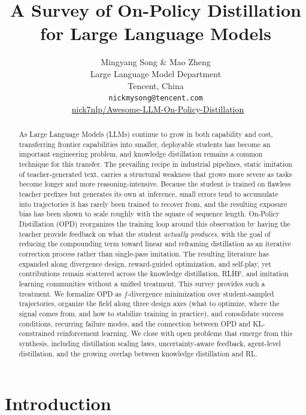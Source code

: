 \documentclass{article} %
\title{A Survey of On-Policy Distillation for Large Language Models}
\author{Mingyang Song \& Mao Zheng \\
Large Language Model Department \\Tencent, China\\
\texttt{nickmysong@tencent.com}\\[2pt]
\faGithub\ \href{https://github.com/nick7nlp/Awesome-LLM-On-Policy-Distillation}{nick7nlp/Awesome-LLM-On-Policy-Distillation}}
\begin{document}
\maketitle

\begin{abstract}
As Large Language Models (LLMs) continue to grow in both capability and cost, transferring frontier capabilities into smaller, deployable students has become an important engineering problem, and knowledge distillation remains a common technique for this transfer. The prevailing recipe in industrial pipelines, static imitation of teacher-generated text, carries a structural weakness that grows more severe as tasks become longer and more reasoning-intensive. Because the student is trained on flawless teacher prefixes but generates its own at inference, small errors tend to accumulate into trajectories it has rarely been trained to recover from, and the resulting exposure bias has been shown to scale roughly with the square of sequence length. On-Policy Distillation (OPD) reorganizes the training loop around this observation by having the teacher provide feedback on what the student \emph{actually produces}, with the goal of reducing the compounding term toward linear and reframing distillation as an iterative correction process rather than single-pass imitation. The resulting literature has expanded along divergence design, reward-guided optimization, and self-play, yet contributions remain scattered across the knowledge distillation, RLHF, and imitation learning communities without a unified treatment. This survey provides such a treatment. We formalize OPD as $f$-divergence minimization over student-sampled trajectories, organize the field along three design axes (what to optimize, where the signal comes from, and how to stabilize training in practice), and consolidate success conditions, recurring failure modes, and the connection between OPD and KL-constrained reinforcement learning. We close with open problems that emerge from this synthesis, including distillation scaling laws, uncertainty-aware feedback, agent-level distillation, and the growing overlap between knowledge distillation and RL.
\end{abstract}

\section{Introduction}
\label{sec:intro}
\end{document}

